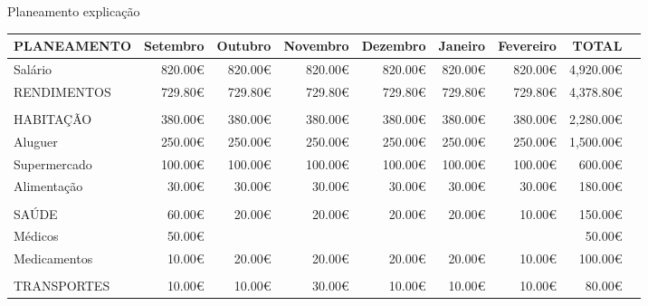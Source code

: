 \documentclass[11pt]{beamer}
\begin{document}
	\begin{frame}[ allowframebreaks ]{Planeamento explicação}

		\begin{table}[!htp]\centering
			\tiny
			\begin{tabular}{lrrrrrrrr}\toprule
				PLANEAMENTO &Setembro &Outubro &Novembro &Dezembro &Janeiro &Fevereiro &TOTAL \\\midrule
				Salário &820.00€ &820.00€ &820.00€ &820.00€ &820.00€ &820.00€ &\cellcolor[HTML]{4285f4}4,920.00€ \\
				\cellcolor[HTML]{4285f4}RENDIMENTOS &\cellcolor[HTML]{4285f4}729.80€ &\cellcolor[HTML]{4285f4}729.80€ &\cellcolor[HTML]{4285f4}729.80€ &\cellcolor[HTML]{4285f4}729.80€ &\cellcolor[HTML]{4285f4}729.80€ &\cellcolor[HTML]{4285f4}729.80€ &\cellcolor[HTML]{4285f4}4,378.80€ \\
				& & & & & & & \\
				\cellcolor[HTML]{4285f4}HABITAÇÃO &\cellcolor[HTML]{4285f4}380.00€ &\cellcolor[HTML]{4285f4}380.00€ &\cellcolor[HTML]{4285f4}380.00€ &\cellcolor[HTML]{4285f4}380.00€ &\cellcolor[HTML]{4285f4}380.00€ &\cellcolor[HTML]{4285f4}380.00€ &\cellcolor[HTML]{4285f4}2,280.00€ \\
				Aluguer &250.00€ &250.00€ &250.00€ &250.00€ &250.00€ &250.00€ &\cellcolor[HTML]{4285f4}1,500.00€ \\
				Supermercado &100.00€ &100.00€ &100.00€ &100.00€ &100.00€ &100.00€ &\cellcolor[HTML]{4285f4}600.00€ \\
				Alimentação &30.00€ &30.00€ &30.00€ &30.00€ &30.00€ &30.00€ &\cellcolor[HTML]{4285f4}180.00€ \\
				& & & & & & & \\
				\cellcolor[HTML]{4285f4}SAÚDE &\cellcolor[HTML]{4285f4}60.00€ &\cellcolor[HTML]{4285f4}20.00€ &\cellcolor[HTML]{4285f4}20.00€ &\cellcolor[HTML]{4285f4}20.00€ &\cellcolor[HTML]{4285f4}20.00€ &\cellcolor[HTML]{4285f4}10.00€ &\cellcolor[HTML]{4285f4}150.00€ \\
				Médicos &50.00€ & & & & & &\cellcolor[HTML]{4285f4}50.00€ \\
				Medicamentos &10.00€ &20.00€ &20.00€ &20.00€ &20.00€ &10.00€ &\cellcolor[HTML]{4285f4}100.00€ \\
				& & & & & & & \\
				\cellcolor[HTML]{4285f4}TRANSPORTES &\cellcolor[HTML]{4285f4}10.00€ &\cellcolor[HTML]{4285f4}10.00€ &\cellcolor[HTML]{4285f4}30.00€ &\cellcolor[HTML]{4285f4}10.00€ &\cellcolor[HTML]{4285f4}10.00€ &\cellcolor[HTML]{4285f4}10.00€ &\cellcolor[HTML]{4285f4}80.00€ \\

\end{tabular}
\end{table}
\end{frame}
\end{document}
